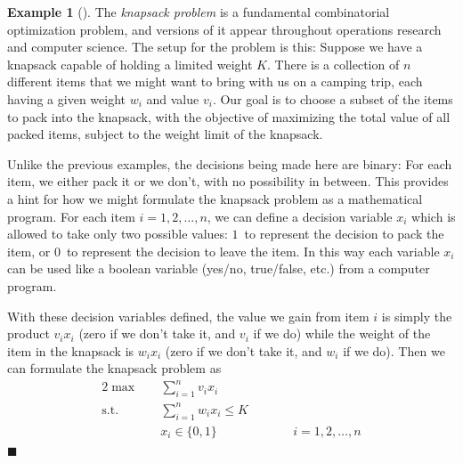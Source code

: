 \documentclass[11pt]{article}
\theoremstyle{definition} %
\newtheorem{ex}{Example}[section] %
\newenvironment{example}[1][]{\begin{ex}[#1]}{\hfill$\blacksquare$\end{ex}} %
\begin{document}
\begin{example}
\label{ex:knapsack}
	The \textit{knapsack problem} is a fundamental combinatorial optimization problem, and versions of it appear throughout operations research and computer science. The setup for the problem is this: Suppose we have a knapsack capable of holding a limited weight $K$. There is a collection of $n$ different items that we might want to bring with us on a camping trip, each having a given weight $w_i$ and value $v_i$. Our goal is to choose a subset of the items to pack into the knapsack, with the objective of maximizing the total value of all packed items, subject to the weight limit of the knapsack.
	
	Unlike the previous examples, the decisions being made here are binary: For each item, we either pack it or we don't, with no possibility in between. This provides a hint for how we might formulate the knapsack problem as a mathematical program. For each item $i=1,2,\dots,n$, we can define a decision variable $x_i$ which is allowed to take only two possible values: $1$~to represent the decision to pack the item, or $0$~to represent the decision to leave the item. In this way each variable $x_i$ can be used like a boolean variable (yes/no, true/false, etc.) from a computer program.
	
	With these decision variables defined, the value we gain from item $i$ is simply the product $v_i x_i$ (zero if we don't take it, and $v_i$ if we do) while the weight of the item in the knapsack is $w_i x_i$ (zero if we don't take it, and $w_i$ if we do). Then we can formulate the knapsack problem as
	\begin{alignat*}{2}
		\tag{maximize total value} \max \quad& \sum_{i=1}^n v_i x_i \\
		\tag{weight limit} \mathrm{s.t.} \quad& \sum_{i=1}^n w_i x_i \le K \\
		\tag{binary decisions} & x_i \in \{0,1\} &\qquad& i=1,2,\dots,n
	\end{alignat*}
\end{example}
\end{document}
